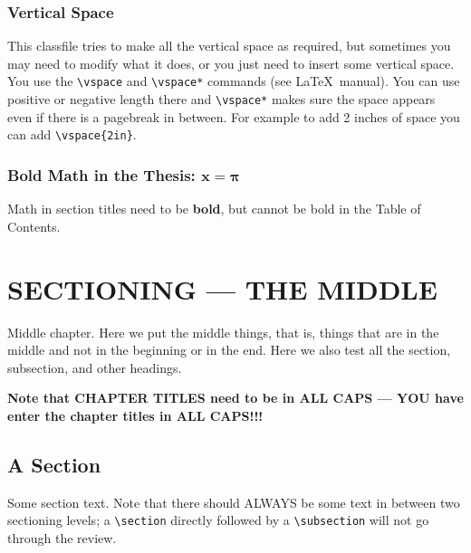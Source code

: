 \subsection{Vertical Space}

This classfile tries to make all the vertical space as required, but
sometimes you may need to modify what it does, or you just need to
insert some vertical space.  You use the \verb+\vspace+ and
\verb+\vspace*+ commands (see \LaTeX\ manual).  You can use positive
or negative length there and \verb+\vspace*+ makes sure the space appears
even if there is a pagebreak in between.  For example to add 2 inches
of space you can add \verb+\vspace{2in}+.


\subsection[Non-Bold Math in the TOC: $x=2\pi/e$]{Bold Math in the Thesis:  $\mathbf{x=\pi}$}

Math in section titles need to be \textbf{bold}, but cannot be bold in
the Table of Contents.

\chapter{SECTIONING --- THE MIDDLE} \label{chapter:middle}

Middle chapter.  Here we put the middle things, that is, things that
are in the middle and not in the beginning or in the end.  Here we
also test all the section, subsection, and other headings.

\textbf{Note that
  CHAPTER TITLES need to be in ALL CAPS --- YOU have enter the chapter
  titles in ALL CAPS!!!}

\section{A Section}

Some section text.  Note that there should ALWAYS be some text in
between two sectioning levels; a \verb+\section+ directly followed by
a \verb+\subsection+ will not go through the review.

